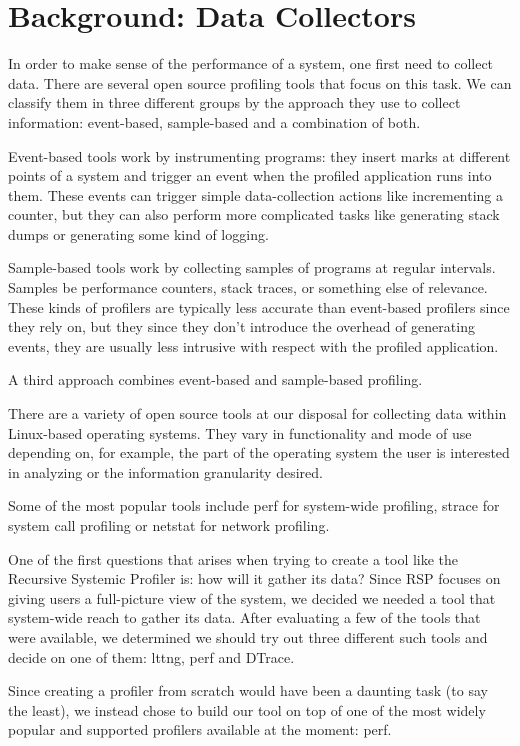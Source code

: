 \documentclass[10pt]{article}
\begin{document}
\section{Background: Data Collectors}
In order to make sense of the performance of a system, one first need to collect data. There are several open source profiling tools that focus on this task. We can classify them in three different groups by the approach they use to collect information: event-based, sample-based and a combination of both. 

Event-based tools work by instrumenting programs: they insert marks at different points of a system and trigger an event when the profiled application runs into them. These events can trigger simple data-collection actions like incrementing a counter, but they can also perform more complicated tasks like generating stack dumps or generating some kind of logging.

Sample-based tools work by collecting samples of programs at regular intervals.  Samples be performance counters, stack traces, or something else of relevance. These kinds of profilers are typically less accurate than event-based profilers since they rely on, but they since they don't introduce the overhead of generating events, they are usually less intrusive with respect with the profiled application.

A third approach combines event-based and sample-based profiling.

There are a variety of open source tools at our disposal for collecting data within Linux-based operating systems. They vary in functionality and mode of use depending on, for example, the part of the operating system the user is interested in analyzing or the information granularity desired.

Some of the most popular tools include perf for system-wide profiling, strace for system call profiling or netstat for network profiling.

One of the first questions that arises when trying to create a tool like the Recursive Systemic Profiler is: how will it gather its data? Since RSP focuses on giving users a full-picture view of the system, we decided we needed a tool that system-wide reach to gather its data. After evaluating a few of the tools that were available, we determined we should try out three different such tools and decide on one of them: lttng, perf and DTrace.

Since creating a profiler from scratch would have been a daunting task (to say the least), we instead chose to build our tool on top of one of the most widely popular and supported profilers available at the moment: perf.
\end{document}
